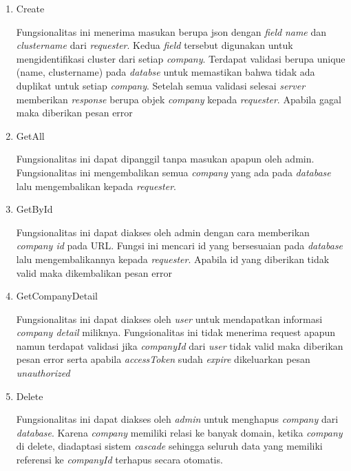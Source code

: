 \begin{enumerate}
    \item Create

          Fungsionalitas ini menerima masukan berupa json dengan \textit{field} \textit{name} dan \textit{cluster\textunderscore name} dari \textit{requester}. Kedua \textit{field} tersebut digunakan untuk mengidentifikasi cluster dari setiap \textit{company}. Terdapat validasi berupa unique (name, cluster\textunderscore name) pada \textit{databse} untuk memastikan bahwa tidak ada duplikat untuk setiap \textit{company}. Setelah semua validasi selesai \textit{server} memberikan \textit{response} berupa objek \textit{company} kepada \textit{requester}. Apabila gagal maka diberikan pesan error

    \item GetAll

          Fungsionalitas ini dapat dipanggil tanpa masukan apapun oleh admin. Fungsionalitas ini mengembalikan semua \textit{company} yang ada pada \textit{database} lalu mengembalikan kepada \textit{requester}.

    \item GetById

          Fungsionalitas ini dapat diakses oleh admin dengan cara memberikan \textit{company id} pada URL. Fungsi ini mencari id yang bersesuaian pada \textit{database} lalu mengembalikannya kepada \textit{requester}. Apabila id yang diberikan tidak valid maka dikembalikan pesan error

    \item GetCompanyDetail

          Fungsionalitas ini dapat diakses oleh \textit{user} untuk mendapatkan informasi \textit{company detail} miliknya. Fungsionalitas ini tidak menerima request apapun namun terdapat validasi jika \textit{companyId} dari \textit{user} tidak valid maka diberikan pesan error serta apabila \textit{accessToken} sudah \textit{expire} dikeluarkan pesan \textit{unauthorized}

    \item Delete

          Fungsionalitas ini dapat diakses oleh \textit{admin} untuk menghapus \textit{company} dari \textit{database}. Karena \textit{company} memiliki relasi ke banyak domain, ketika \textit{company} di delete, diadaptasi sistem \textit{cascade} sehingga seluruh data yang memiliki referensi ke \textit{companyId} terhapus secara otomatis.

\end{enumerate}


